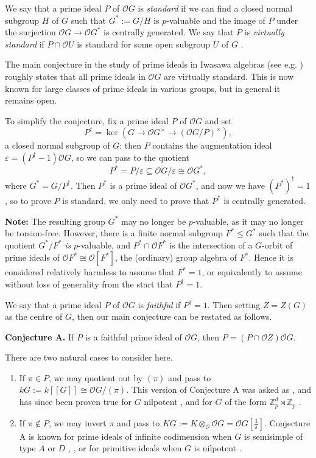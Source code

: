 \documentclass[12pt,a4paper]{article}
\theoremstyle{definition}
\theoremstyle{remark}
\theoremstyle{custthm}
\renewcommand{\O}{\mathcal{O}}
\begin{document}
We say that a prime ideal $P$ of $\O G$ is \emph{standard} if we can find a closed normal subgroup $H$ of $G$ such that $G^*:=G/H$ is $p$-valuable and the image of $P$ under the surjection $\O G\to \O G^*$ is centrally generated. We say that $P$ is \emph{virtually standard} if $P\cap \O U$ is standard for some open subgroup $U$ of $G$ \cite[Definition 1.1]{jones-primitive-ideals}. 

The main conjecture in the study of prime ideals in Iwasawa algebras (see e.g. \cite[Conjecture 1.2]{jones-primitive-ideals}) roughly states that all prime ideals in $\O G$ are virtually standard. This is now known for large classes of prime ideals in various groups, but in general it remains open.

To simplify the conjecture, fix a prime ideal $P$ of $\O G$ and set $$P^\dagger = \ker(G\to \O G^\times\to (\O G/P)^\times),$$ a closed normal subgroup of $G$: then $P$ contains the augmentation ideal $\varepsilon = (P^\dagger - 1)\O G$, so we can pass to the quotient $$P^* = P/\varepsilon \subseteq \O G/\varepsilon \cong \O G^*,$$ where $G^* = G/P^\dagger$. Then $P^*$ is a prime ideal of $\O G^*$, and now we have $(P^*)^\dagger = 1$, so to prove $P$ is standard, we only need to prove that $P^*$ is centrally generated.

\textbf{Note:} The resulting group $G^*$ may no longer be $p$-valuable, as it may no longer be torsion-free. However, there is a finite normal subgroup $F^* \leq G^*$ such that the quotient $G^*/F^*$ \emph{is} $p$-valuable, and $P^* \cap \O F^*$ is the intersection of a $G$-orbit of prime ideals of $\O F^* \cong \O[F^*]$, the (ordinary) group algebra of $F^*$. Hence it is considered relatively harmless to assume that $F^* = 1$, or equivalently to assume without loss of generality from the start that $P^\dagger = 1$.

We say that a prime ideal $P$ of $\O G$ is \emph{faithful} if $P^\dagger=1$. Then setting $Z=Z(G)$ as the centre of $G$, then our main conjecture can be restated as follows.

\textbf{Conjecture A.} If $P$ is a faithful prime ideal of $\O G$, then $P = (P\cap \O Z)\O G$.

There are two natural cases to consider here.

\begin{enumerate}
\item If $\pi\in P$, we may quotient out by $(\pi)$ and pass to $kG := k[[G]] \cong \O G/(\pi)$. This version of Conjecture A was asked as \cite[Question O]{ArdBro06}, and has since been proven true for $G$ nilpotent \cite[Theorem 8.4]{ardakovInv}, and for $G$ of the form $\mathbb{Z}_p^d\rtimes\mathbb{Z}_p$ \cite[Theorem 1.4]{jones-abelian-by-procyclic}.
\item If $\pi\not\in P$, we may invert $\pi$ and pass to $KG :=K\otimes_\O \O G= \O G[\frac{1}{\pi}]$. Conjecture A is known for prime ideals of infinite codimension when $G$ is semisimple of type $A$ or $D$ \cite[Theorem 3]{Mann}, \cite[Theorem 2]{Mann2}, or for primitive ideals when $G$ is nilpotent \cite[Theorem A]{jones-primitive-ideals}.
\end{enumerate}
\end{document}
